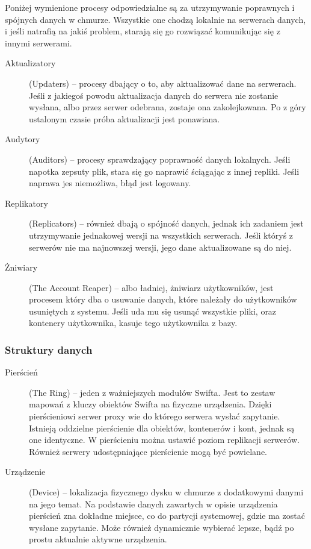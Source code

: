 Poniżej wymienione procesy odpowiedzialne są za utrzymywanie poprawnych i spójnych danych w chmurze. Wszystkie one chodzą lokalnie na serwerach danych, i jeśli natrafią na jakiś problem, starają się go rozwiązać komunikując się z innymi serwerami.

\begin{description}
\item[Aktualizatory] (Updaters) -- procesy dbający o to, aby aktualizować dane na serwerach. Jeśli z jakiegoś powodu aktualizacja danych do serwera nie zostanie wysłana, albo przez serwer odebrana, zostaje ona zakolejkowana. Po z góry ustalonym czasie próba aktualizacji jest ponawiana.
\item[Audytory] (Auditors) -- procesy sprawdzający poprawność danych lokalnych. Jeśli napotka zepsuty plik, stara się go naprawić ściągając z innej repliki. Jeśli naprawa jes niemożliwa, błąd jest logowany. 
\item[Replikatory] (Replicators) -- również dbają o spójność danych, jednak ich zadaniem jest utrzymywanie jednakowej wersji na wszystkich serwerach. Jeśli któryś z serwerów nie ma najnowszej wersji, jego dane aktualizowane są do niej.
\item[Żniwiary] (The Account Reaper) -- albo ładniej, żniwiarz użytkowników, jest procesem który dba o usuwanie danych, które należały do użytkowników usuniętych z systemu. Jeśli uda mu się usunąć wszystkie pliki, oraz kontenery użytkownika, kasuje tego użytkownika z bazy.
\end{description}

\subsubsection{Struktury danych}\label{sub:struktury danych}

\begin{description}
\item[Pierścień] (The Ring) -- jeden z ważniejszych modułów Swifta. Jest to zestaw mapowań z kluczy obiektów Swifta na fizyczne urządzenia. Dzięki pierścieniowi serwer proxy wie do którego serwera wysłać zapytanie. Istnieją oddzielne pierścienie dla obiektów, kontenerów i kont, jednak są one identyczne. W pierścieniu można ustawić poziom replikacji serwerów. Również serwery udostępniające pierścienie mogą być powielane.
\item[Urządzenie] (Device) -- lokalizacja fizycznego dysku w chmurze z dodatkowymi danymi na jego temat. Na podstawie danych zawartych w opisie urządzenia pierścień zna dokładne miejsce, co do partycji systemowej, gdzie ma zostać wysłane zapytanie. Może również dynamicznie wybierać lepsze, bądź po prostu aktualnie aktywne urządzenia.
\end{description}

